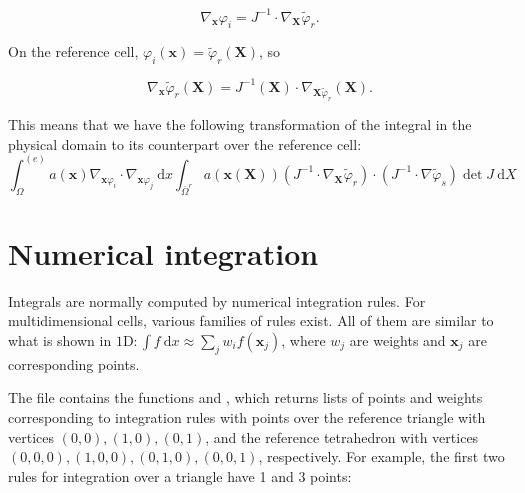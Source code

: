 \documentclass[../main.tex]{subfiles}
\begin{document}
		\begin{equation}
			\label{eqa202}
			\nabla_{\boldsymbol{x}} \varphi_{i}=J^{-1} \cdot \nabla_{\boldsymbol{X}} 	\tilde{\varphi}_{r} .
		\end{equation}
	
		\noindent On the reference cell, $\varphi_{i}(\boldsymbol{x})=\tilde{\varphi}_{r}(\boldsymbol{X})$, so
		
		\begin{equation}
			\label{eqa203}
			\nabla_{\boldsymbol{x}} \tilde{\varphi}_{r}(\boldsymbol{X})=J^{-1}(\boldsymbol{X}) \cdot \nabla_{\boldsymbol{X} \tilde{\varphi}_{r}}(\boldsymbol{X}) .
		\end{equation}
	
		This means that we have the following transformation of the integral in the physical domain to its counterpart over the reference cell:
		\begin{equation}
			\label{eqa204}
			\int_{\Omega}^{(e)} a(\boldsymbol{x}) \nabla_{\boldsymbol{x} \varphi_{i}} \cdot 	\nabla_{\boldsymbol{x} \varphi_{j}} \mathrm{~d} x \int_{\bar{\Omega}^{r}} a(\boldsymbol{x}(\boldsymbol{X}))\left(J^{-1} \cdot \nabla_{\boldsymbol{X}} \tilde{\varphi}_{r}\right) \cdot\left(J^{-1} \cdot \nabla \tilde{\varphi}_{s}\right) \operatorname{det} J \mathrm{~d} X
		\end{equation}\bigbreak
	
	\section[Numerical integration]{Numerical integration}
		\label{sec:sec_17_2}
		\noindent Integrals are normally computed by numerical integration rules. For multidimensional cells, various families of rules exist. All of them are similar to what is shown in $1 \mathrm{D}: \int f \mathrm{~d} x \approx \sum_{j} w_{i} f\left(\boldsymbol{x}_{j}\right)$, where $w_{j}$ are weights and $\boldsymbol{x}_{j}$ are corresponding points.
		
		The file  contains the functions  and , which returns lists of points and weights corresponding to integration rules with  points over the reference triangle with vertices $(0,0),(1,0),(0,1)$, and the reference tetrahedron with vertices $(0,0,0),(1,0,0),(0,1,0),(0,0,1)$, respectively. For example, the first two rules for integration over a triangle have 1 and 3 points:
		
\end{document}
